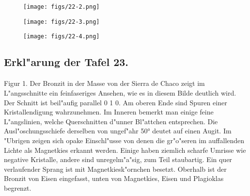 \documentclass[a4paper, 11pt, oneside, polutonikogreek, german]{article}
\begin{document}
\vspace*{\fill}
\begin{figure}[H]
\centering
\texttt{[image: figs/22-2.png]}
\caption{}
\end{figure}
\vspace*{\fill}
\clearpage

\vspace*{\fill}
\begin{figure}[H]
\centering
\texttt{[image: figs/22-3.png]}
\caption{}
\end{figure}
\vspace*{\fill}
\clearpage

\vspace*{\fill}
\begin{figure}[H]
\centering
\texttt{[image: figs/22-4.png]}
\caption{}
\end{figure}
\vspace*{\fill} 
\clearpage

\subsection{Erkl"arung der Tafel 23.}
\paragraph{}
Figur 1. Der Bronzit in der Masse von der Sierra de Chaco zeigt im L"angsschnitte ein feinfaseriges Ansehen, wie es in diesem Bilde deutlich wird. Der Schnitt ist beil"aufig parallel 0 1 0. Am oberen Ende sind Spuren einer Kristallendigung wahrzunehmen. Im Inneren bemerkt man einige feine L"angslinien, welche Querschnitten d"unner Bl"attchen entsprechen. Die Ausl"oschungsschiefe derselben von ungef"ahr 50° deutet auf einen Augit. Im "Ubrigen zeigen sich opake Einschl"usse von denen die gr"o"seren im auffallenden Lichte als Magnetkies erkannt werden. Einige haben ziemlich scharfe Umrisse wie negative Kristalle, andere sind unregelm"a"sig, zum Teil staubartig. Ein quer verlaufender Sprang ist mit Magnetkiesk"ornchen besetzt. Oberhalb ist der Bronzit von Eisen eingefasst, unten von Magnetkies, Eisen und Plagioklas begrenzt.
\end{document}
